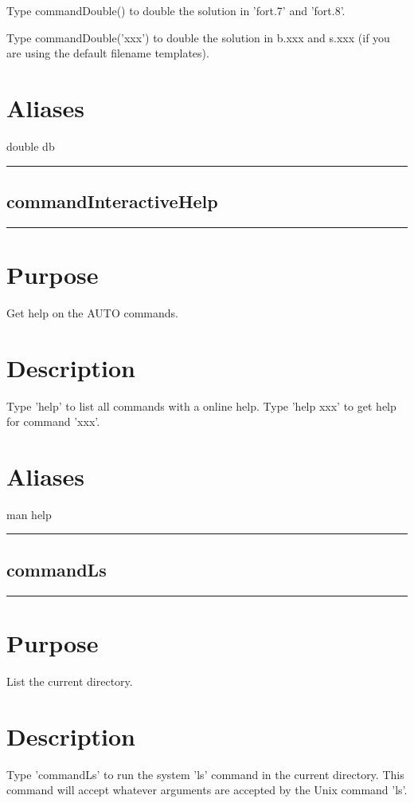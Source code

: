 \documentclass[12pt]{report}
\begin{document}
\begin{minipage}{6in}
    Type commandDouble() to double the solution in 'fort.7' and 'fort.8'.

    Type commandDouble('xxx') to double the solution in b.xxx and s.xxx (if you
    are using the default filename templates).
    \section*{Aliases}
double db \medskip\hrule\end{minipage}\subsection{commandInteractiveHelp} \label{sec:clui_ref_commandInteractiveHelp}\begin{minipage}{6in}\hrule\medskip\section*{Purpose}
Get help on the AUTO commands.\section*{Description}
    
    Type 'help' to list all commands with a online help.
    Type 'help xxx' to get help for command 'xxx'.
    \section*{Aliases}
man help \medskip\hrule\end{minipage}\subsection{commandLs} \label{sec:clui_ref_commandLs}\begin{minipage}{6in}\hrule\medskip\section*{Purpose}
List the current directory.\section*{Description}
    
    Type 'commandLs' to run the system 'ls' command in the current directory.  This
    command will accept whatever arguments are accepted by the Unix command
    'ls'.

\end{minipage}
\end{document}
